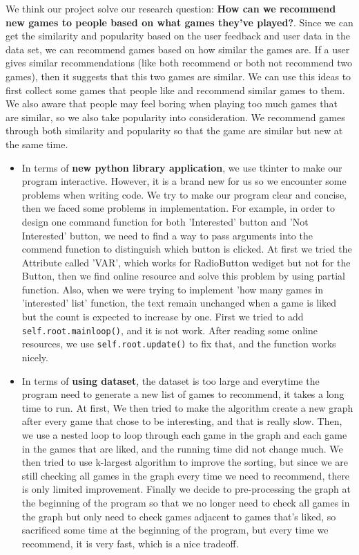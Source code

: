 \documentclass{article}
\begin{document}
We think our project solve our research question: \textbf{How  can  we  recommend  new  games  to  people  based on what games they’ve played?}. Since we can get the similarity and popularity based on the user feedback and user data in the data set, we can recommend games based on how similar the games are. If a user gives similar recommendations (like both recommend or both not recommend two games), then it suggests that this two games are similar. We can use this ideas to first collect some games that people like and recommend similar games to them. We also aware that people may feel boring when playing too much games that are similar, so we also take popularity into consideration. We recommend games through both similarity and popularity so that the game are similar but new at the same time.
\begin{itemize}
    \item In terms of \textbf{new python library application}, we use tkinter to make our program interactive. However, it is a brand new for us so we encounter some problems when writing code. We try to make our program clear and concise, then we faced some problems in implementation. For example, in order to design one command function for both 'Interested' button and 'Not Interested' button, we need to find a way to pass arguments into the commend function to distinguish which button is clicked. At first we tried the Attribute called 'VAR', which works for RadioButton wediget but not for the Button, then we find online resource and solve this problem by using partial function. Also, when we were trying to implement 'how many games in 'interested' list' function, the text remain unchanged when a game is liked but the count is expected to increase by one. First we tried to add \texttt{self.root.mainloop()}, and it is not work. After reading some online resources, we use \texttt{self.root.update()} to fix that, and the function works nicely.
    \item In terms of \textbf{using dataset}, the dataset is too large and everytime the program need to generate a new list of games to recommend, it takes a long time to run. At first, We then tried to make the algorithm create a new graph after every game that chose to be interesting, and that is really slow. Then, we use a nested loop to loop through each game in the graph and each game in the games that are liked, and the running time did not change much. We then tried to use k-largest algorithm to improve the sorting, but since we are still checking all games in the graph every time we need to recommend, there is only limited improvement. Finally we decide to pre-processing the graph at the beginning of the program so that we no longer need to check all games in the graph but only need to check games adjacent to games that's liked, so sacrificed some time at the beginning of the program, but every time we recommend, it is very fast, which is a nice tradeoff.

\end{itemize}
\end{document}
